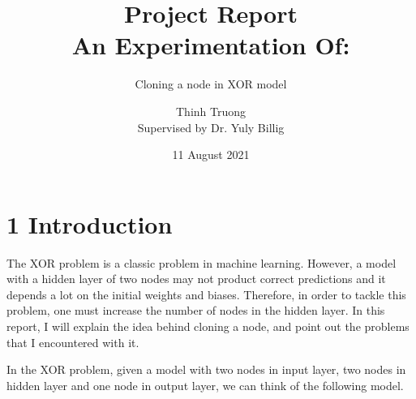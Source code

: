 \documentclass[12pt,english,]{article}
\title{\textbf{Project Report}\\
\Large{An Experimentation Of:}}
\subtitle{Cloning a node in XOR model}
\author{Thinh Truong \\ Supervised by Dr. Yuly Billig}
\date{11 August 2021}
\newcommand{\inputnum}{2}
\newcommand{\hiddennum}{2}
\newcommand{\outputnum}{1}
\begin{document}
\maketitle

\hypertarget{section1}{%
\section{\texorpdfstring{1
\enspace Introduction}{1 Introduction}}\label{section1}}

The XOR problem is a classic problem in machine learning. However, a model with a hidden layer of two nodes may not product correct predictions and it depends a lot on the initial weights and biases. Therefore, in order to tackle this problem, one must increase the number of nodes in the hidden layer. In this report, I will explain the idea behind cloning a node, and point out the problems that I encountered with it.

In the XOR problem, given a model with two nodes in input layer, two nodes in hidden layer and one node in output layer, we can think of the following model. 

\end{document}

